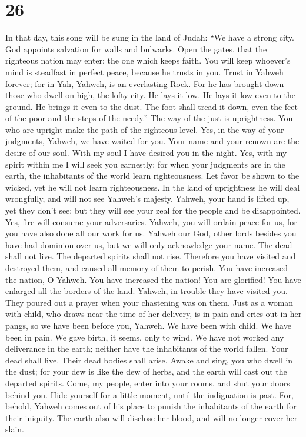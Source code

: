 \hypertarget{section-25}{%
\section{26}\label{section-25}}

 In that day, this song will be sung in the land of Judah:
``We have a strong city. God appoints salvation for walls and bulwarks.
 Open the gates, that the righteous nation may enter: the
one which keeps faith.  You will keep whoever's mind is
steadfast in perfect peace, because he trusts in you.  Trust
in Yahweh forever; for in Yah, Yahweh, is an everlasting Rock.
 For he has brought down those who dwell on high, the lofty
city. He lays it low. He lays it low even to the ground. He brings it
even to the dust.  The foot shall tread it down, even the
feet of the poor and the steps of the needy.''  The way of
the just is uprightness. You who are upright make the path of the
righteous level.  Yes, in the way of your judgments, Yahweh,
we have waited for you. Your name and your renown are the desire of our
soul.  With my soul I have desired you in the night. Yes,
with my spirit within me I will seek you earnestly; for when your
judgments are in the earth, the inhabitants of the world learn
righteousness.  Let favor be shown to the wicked, yet he
will not learn righteousness. In the land of uprightness he will deal
wrongfully, and will not see Yahweh's majesty.  Yahweh,
your hand is lifted up, yet they don't see; but they will see your zeal
for the people and be disappointed. Yes, fire will consume your
adversaries.  Yahweh, you will ordain peace for us, for you
have also done all our work for us.  Yahweh our God, other
lords besides you have had dominion over us, but we will only
acknowledge your name.  The dead shall not live. The
departed spirits shall not rise. Therefore you have visited and
destroyed them, and caused all memory of them to perish. 
You have increased the nation, O Yahweh. You have increased the nation!
You are glorified! You have enlarged all the borders of the land.
 Yahweh, in trouble they have visited you. They poured out
a prayer when your chastening was on them.  Just as a woman
with child, who draws near the time of her delivery, is in pain and
cries out in her pangs, so we have been before you, Yahweh.
 We have been with child. We have been in pain. We gave
birth, it seems, only to wind. We have not worked any deliverance in the
earth; neither have the inhabitants of the world fallen. 
Your dead shall live. Their dead bodies shall arise. Awake and sing, you
who dwell in the dust; for your dew is like the dew of herbs, and the
earth will cast out the departed spirits.  Come, my people,
enter into your rooms, and shut your doors behind you. Hide yourself for
a little moment, until the indignation is past.  For,
behold, Yahweh comes out of his place to punish the inhabitants of the
earth for their iniquity. The earth also will disclose her blood, and
will no longer cover her slain.

